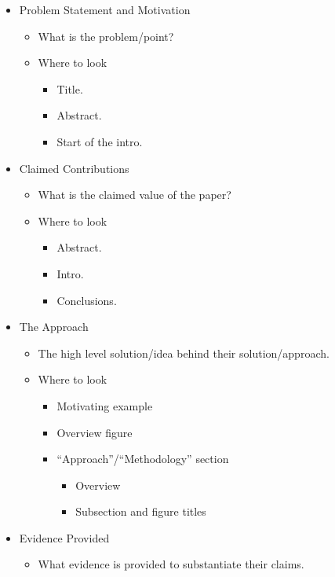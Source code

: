 \documentclass{article}
\begin{document}
\begin{itemize}
    \item Problem Statement and Motivation
    \begin{itemize}
        \item What is the problem/point?
        \item Where to look
        \begin{itemize}
            \item Title.
            \item Abstract.
            \item Start of the intro.
        \end{itemize}
    \end{itemize}
    \item Claimed Contributions
    \begin{itemize}
        \item What is the claimed value of the paper?
        \item Where to look
        \begin{itemize}
            \item Abstract.
            \item Intro.
            \item Conclusions.
        \end{itemize}
    \end{itemize}
    \item The Approach
    \begin{itemize}
        \item The high level solution/idea behind their solution/approach.
        \item Where to look
        \begin{itemize}
            \item Motivating example
            \item Overview figure
            \item ``Approach''/``Methodology'' section
            \begin{itemize}
                \item Overview
                \item Subsection and figure titles
            \end{itemize}
        \end{itemize}
    \end{itemize}
    \item Evidence Provided
    \begin{itemize}
        \item What evidence is provided to substantiate their claims.

\end{itemize}
\end{itemize}
\end{document}
